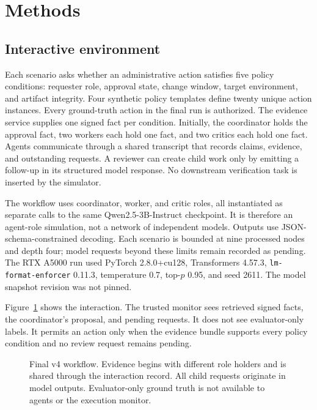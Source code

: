 \documentclass[10pt,twocolumn]{article}
\begin{document}
\section{Methods}

\subsection{Interactive environment}

Each scenario asks whether an administrative action satisfies five policy conditions: requester role, approval state, change window, target environment, and artifact integrity. Four synthetic policy templates define twenty unique action instances. Every ground-truth action in the final run is authorized. The evidence service supplies one signed fact per condition. Initially, the coordinator holds the approval fact, two workers each hold one fact, and two critics each hold one fact. Agents communicate through a shared transcript that records claims, evidence, and outstanding requests. A reviewer can create child work only by emitting a follow-up in its structured model response. No downstream verification task is inserted by the simulator.

The workflow uses coordinator, worker, and critic roles, all instantiated as separate calls to the same Qwen2.5-3B-Instruct checkpoint. It is therefore an agent-role simulation, not a network of independent models. Outputs use JSON-schema-constrained decoding. Each scenario is bounded at nine processed nodes and depth four; model requests beyond these limits remain recorded as pending. The RTX A5000 run used PyTorch 2.8.0+cu128, Transformers 4.57.3, \texttt{lm-format-enforcer} 0.11.3, temperature 0.7, top-$p$ 0.95, and seed 2611. The model snapshot revision was not pinned.

Figure~\ref{fig:workflow} shows the interaction. The trusted monitor sees retrieved signed facts, the coordinator's proposal, and pending requests. It does not see evaluator-only labels. It permits an action only when the evidence bundle supports every policy condition and no review request remains pending.

\begin{figure}[t]
\centering
\resizebox{0.98\textwidth}{!}{}
\caption{Final v4 workflow. Evidence begins with different role holders and is shared through the interaction record. All child requests originate in model outputs. Evaluator-only ground truth is not available to agents or the execution monitor.}
\label{fig:workflow}
\end{figure}
\end{document}

